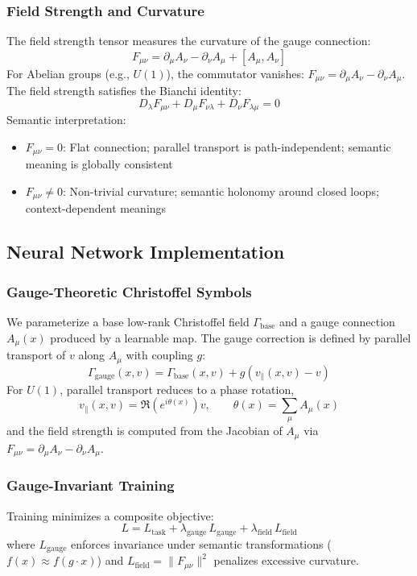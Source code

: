 \documentclass{article}
\numberwithin{equation}{section}
\begin{document}
\subsubsection{Field Strength and Curvature}
The field strength tensor measures the curvature of the gauge connection:
\[
F_{\mu\nu} = \partial_\mu A_\nu - \partial_\nu A_\mu + [A_\mu, A_\nu]
\]
For Abelian groups (e.g., $U(1)$), the commutator vanishes: $F_{\mu\nu} = \partial_\mu A_\nu - \partial_\nu A_\mu$. The field strength satisfies the Bianchi identity:
\[
D_\lambda F_{\mu\nu} + D_\mu F_{\nu\lambda} + D_\nu F_{\lambda\mu} = 0
\]
Semantic interpretation:
\begin{itemize}
\item $F_{\mu\nu} = 0$: Flat connection; parallel transport is path-independent; semantic meaning is globally consistent
\item $F_{\mu\nu} \ne 0$: Non-trivial curvature; semantic holonomy around closed loops; context-dependent meanings
\end{itemize}

\subsection{Neural Network Implementation}
\subsubsection{Gauge-Theoretic Christoffel Symbols}
We parameterize a base low-rank Christoffel field $\Gamma_{\text{base}}$ and a gauge connection $A_\mu(x)$ produced by a learnable map. The gauge correction is defined by parallel transport of $v$ along $A_\mu$ with coupling $g$:
\[
\Gamma_{\text{gauge}}(x,v) = \Gamma_{\text{base}}(x,v) + g\left(v_{\parallel}(x,v) - v\right)
\]
For $U(1)$, parallel transport reduces to a phase rotation,
\[
v_{\parallel}(x,v) = \Re\left(e^{i\theta(x)}\right) v,\qquad \theta(x)=\sum_\mu A_\mu(x)
\]
and the field strength is computed from the Jacobian of $A_\mu$ via $F_{\mu\nu}=\partial_\mu A_\nu-\partial_\nu A_\mu$.

\subsubsection{Gauge-Invariant Training}
Training minimizes a composite objective:
\[
L = L_{\text{task}} + \lambda_{\text{gauge}}\,L_{\text{gauge}} + \lambda_{\text{field}}\,L_{\text{field}}
\]
where $L_{\text{gauge}}$ enforces invariance under semantic transformations ($f(x)\approx f(g\cdot x)$) and $L_{\text{field}}=\|F_{\mu\nu}\|^2$ penalizes excessive curvature.
\end{document}
